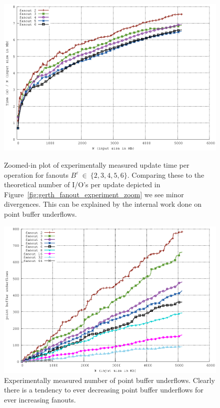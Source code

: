 \documentclass[twoside,11pt,openright]{report}
\def \epsilon {\varepsilon}
\begin{document}
\begin{figure}[]
\includegraphics[width=\textwidth]{../src/experiments/gerth_fanout_experiment_results/2016-05-06.11_52_24/time_zoomed}
\caption{Zoomed-in plot of experimentally measured update time per operation for fanouts $B^\epsilon~\in~\{2,3,4,5,6\}$. Comparing these to the theoretical number of I/O's per update depicted in Figure~\ref{fig:gerth_fanout_experiment_zoom} we see minor divergences. This can be explained by the internal work done on point buffer underflows.}
\label{fig:gerth_fanout_experiment_time_zoomed}
\includegraphics[width=\textwidth]{../src/experiments/gerth_fanout_experiment_results/2016-05-06.11_52_24/pbu}
\caption{Experimentally measured number of point buffer underflows. Clearly there is a tendency to ever decreasing point buffer underflows for ever increasing fanouts.}
\label{fig:gerth_fanout_experiment_pbu}
\end{figure}
\end{document}

